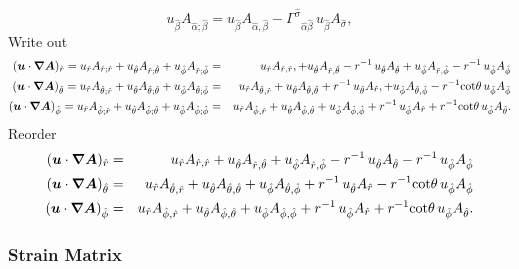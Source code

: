 \documentclass[\mydriver,12pt,twoside,notitlepage,a4paper]{article}
\renewcommand{\vec}[1]{\mbox{\boldmath{$#1$}}}
\newcommand{\Av}            {\vec{A}}
\newcommand{\uv}            {\vec{u}}
\newcommand{\nab}{\mbox{\boldmath $\nabla$} {}}
\begin{document}
\begin{equation}
u_{\hat\beta} A_{\hat\alpha;\hat\beta}=u_{\hat\beta} A_{\hat\alpha,\hat\beta}
-{\Gamma^{\hat\sigma}}_{\hat\alpha\hat\beta}\,u_{\hat\beta} A_{\hat\sigma},
\end{equation}
Write out
\begin{eqnarray}
(\uv\cdot\nab\Av)_{\hat r}=
u_{\hat r}A_{\hat r;\hat r}
+u_{\hat\theta}A_{\hat r;\hat\theta}
+u_{\hat\phi}A_{\hat r;\hat\phi}
&=&u_{\hat r}A_{\hat r,\hat r},
+u_{\hat\theta}A_{\hat r,\hat\theta}-r^{-1}\,u_{\hat\theta}A_{\hat\theta}
+u_{\hat\phi}A_{\hat r,\hat\phi}-r^{-1}\,u_{\hat\phi}A_{\hat\phi}
\cr
(\uv\cdot\nab\Av)_{\hat\theta}=
u_{\hat r}A_{\hat\theta;\hat r}
+u_{\hat\theta}A_{\hat\theta;\hat\theta}
+u_{\hat\phi}A_{\hat\theta;\hat\phi}
&=&u_{\hat r}A_{\hat\theta,\hat r}
+u_{\hat\theta}A_{\hat\theta,\hat\theta}+r^{-1}\,u_{\hat\theta}A_{\hat r},
+u_{\hat\phi}A_{\hat\theta,\hat\phi}-r^{-1}\!\cot\!\theta\,u_{\hat\phi}A_{\hat\phi}
\cr
(\uv\cdot\nab\Av)_{\hat\phi}=
u_{\hat r}A_{\hat\phi;\hat r}
+u_{\hat\theta}A_{\hat\phi;\hat\theta}
+u_{\hat\phi}A_{\hat\phi;\hat\phi}
&=&u_{\hat r}A_{\hat\phi,\hat r}
+u_{\hat\theta}A_{\hat\phi,\hat\theta}
+u_{\hat\phi}A_{\hat\phi,\hat\phi}+r^{-1}\,u_{\hat\phi}A_{\hat r}+r^{-1}\!\cot\!\theta\,u_{\hat\phi}A_{\hat\theta}.
\nonumber
\end{eqnarray}
Reorder
\begin{eqnarray}
(\uv\cdot\nab\Av)_{\hat r}
&=&u_{\hat r}A_{\hat r,\hat r}+u_{\hat\theta}A_{\hat r,\hat\theta}+u_{\hat\phi}A_{\hat r,\hat\phi}
-r^{-1}\,u_{\hat\theta}A_{\hat\theta}-r^{-1}\,u_{\hat\phi}A_{\hat\phi}
\cr
(\uv\cdot\nab\Av)_{\hat\theta}
&=&u_{\hat r}A_{\hat\theta,\hat r}+u_{\hat\theta}A_{\hat\theta,\hat\theta}+u_{\hat\phi}A_{\hat\theta,\hat\phi}
+r^{-1}\,u_{\hat\theta}A_{\hat r}-r^{-1}\!\cot\!\theta\,u_{\hat\phi}A_{\hat\phi}
\cr
(\uv\cdot\nab\Av)_{\hat\phi}
&=&u_{\hat r}A_{\hat\phi,\hat r}+u_{\hat\theta}A_{\hat\phi,\hat\theta}+u_{\hat\phi}A_{\hat\phi,\hat\phi}
+r^{-1}\,u_{\hat\phi}A_{\hat r}+r^{-1}\!\cot\!\theta\,u_{\hat\phi}A_{\hat\theta}.
\end{eqnarray}

\subsubsection{Strain Matrix}
\end{document}
